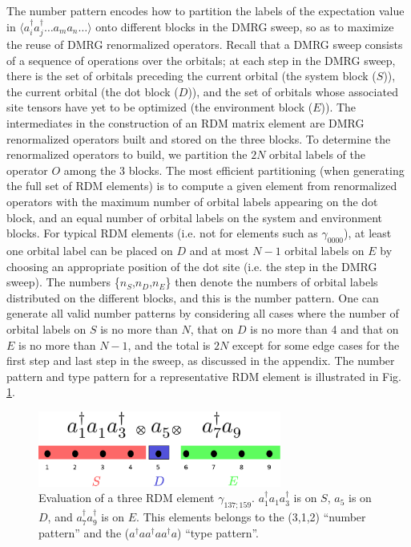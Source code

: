 The number pattern encodes how to partition the labels of the expectation value in $\langle a^\dagger_i a^\dagger_j\dots a_m a_n\dots \rangle$ onto different blocks in the DMRG sweep, so as to maximize the reuse of DMRG renormalized operators.
Recall that a DMRG sweep consists of a sequence of operations over the orbitals; at each step in the DMRG sweep, there is the set of
orbitals preceding the current orbital (the system block (${S}$)), the current orbital (the dot block (${D}$)), and the set of orbitals whose
associated site tensors have yet to be optimized (the environment block (${E}$)). 
The intermediates in the construction of an RDM matrix element are DMRG renormalized operators  built and stored on the three blocks. 
To determine the renormalized operators to build, we partition the $2N$ orbital labels of the operator ${O}$ 
among the 3 blocks. The most efficient partitioning (when generating
the full set of RDM elements) is to compute a given element from renormalized operators with
the maximum number of orbital labels appearing on the dot block, and an
equal number of  orbital labels on the system and environment blocks. 
For typical RDM elements (i.e. not for elements such as $\gamma_{0000}$), at least one orbital label can be placed on $D$ and at most $N-1$ orbital labels on $E$ by choosing an appropriate position of the dot site (i.e. the step in the DMRG sweep). 
The numbers \{$n_S$,$n_D$,$n_E$\} then denote the numbers of orbital labels distributed on the different blocks, and this
is the number pattern. One can generate all valid number patterns by considering all cases where the number of orbital labels on $S$ is no more than $N$, that on $D$ is no more than 4 and that on $E$ is no more than $N-1$, and the total is $2N$ except for some edge cases for the first step and last step in the sweep, as discussed in the appendix.
The number pattern and type pattern for a representative RDM element is illustrated in Fig. \ref{fig:operator_split}. 


\begin{figure}
  \includegraphics[width=8cm]{operator_split.eps}
  \caption{\label{fig:operator_split} Evaluation of a three RDM element $\gamma_{137;159}$. $a_1^\dagger a_1 a^\dagger_3$ is on $S$, $a_5$ is on $D$, and $a^\dagger_7a^\dagger_9$ is on $E$. This elements belongs to the (3,1,2) ``number pattern'' and the ($a^\dagger a a^\dagger a a^\dagger a$) ``type pattern''.}
\end{figure}

